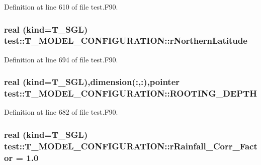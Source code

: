 Definition at line 610 of file test.F90.

\hypertarget{typetest_1_1_t___m_o_d_e_l___c_o_n_f_i_g_u_r_a_t_i_o_n_a07d016cbd947b4239f5336eb37a5b7f3}{
\subsubsection[{rNorthernLatitude}]{\setlength{\rightskip}{0pt plus 5cm}real (kind={\bf T\_\-SGL}) {\bf test::T\_\-MODEL\_\-CONFIGURATION::rNorthernLatitude}}}
\label{typetest_1_1_t___m_o_d_e_l___c_o_n_f_i_g_u_r_a_t_i_o_n_a07d016cbd947b4239f5336eb37a5b7f3}


Definition at line 694 of file test.F90.

\hypertarget{typetest_1_1_t___m_o_d_e_l___c_o_n_f_i_g_u_r_a_t_i_o_n_a5b28e1cecfbed657853ee8f7d1780938}{
\subsubsection[{ROOTING\_\-DEPTH}]{\setlength{\rightskip}{0pt plus 5cm}real (kind={\bf T\_\-SGL}),dimension(:,:),pointer {\bf test::T\_\-MODEL\_\-CONFIGURATION::ROOTING\_\-DEPTH}}}
\label{typetest_1_1_t___m_o_d_e_l___c_o_n_f_i_g_u_r_a_t_i_o_n_a5b28e1cecfbed657853ee8f7d1780938}


Definition at line 682 of file test.F90.

\hypertarget{typetest_1_1_t___m_o_d_e_l___c_o_n_f_i_g_u_r_a_t_i_o_n_a2ec91c83b69bb8fe206ae9d047ec496c}{
\subsubsection[{rRainfall\_\-Corr\_\-Factor}]{\setlength{\rightskip}{0pt plus 5cm}real (kind={\bf T\_\-SGL}) {\bf test::T\_\-MODEL\_\-CONFIGURATION::rRainfall\_\-Corr\_\-Factor} = 1.0}}
\label{typetest_1_1_t___m_o_d_e_l___c_o_n_f_i_g_u_r_a_t_i_o_n_a2ec91c83b69bb8fe206ae9d047ec496c}


